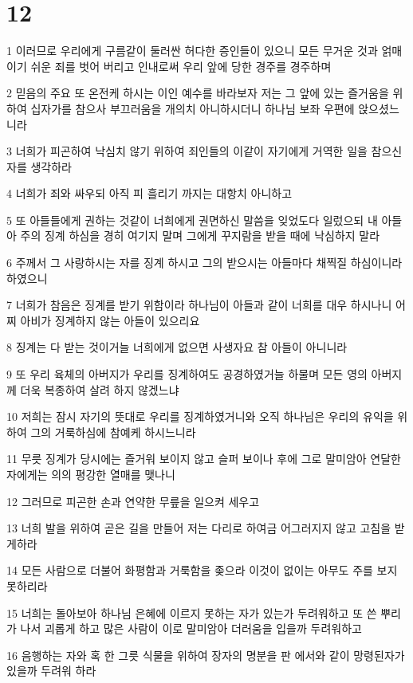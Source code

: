 \chapter{12}

\par 1 이러므로 우리에게 구름같이 둘러싼 허다한 증인들이 있으니 모든 무거운 것과 얽매이기 쉬운 죄를 벗어 버리고 인내로써 우리 앞에 당한 경주를 경주하며
\par 2 믿음의 주요 또 온전케 하시는 이인 예수를 바라보자 저는 그 앞에 있는 즐거움을 위하여 십자가를 참으사 부끄러움을 개의치 아니하시더니 하나님 보좌 우편에 앉으셨느니라
\par 3 너희가 피곤하여 낙심치 않기 위하여 죄인들의 이같이 자기에게 거역한 일을 참으신 자를 생각하라
\par 4 너희가 죄와 싸우되 아직 피 흘리기 까지는 대항치 아니하고
\par 5 또 아들들에게 권하는 것같이 너희에게 권면하신 말씀을 잊었도다 일렀으되 내 아들아 주의 징계 하심을 경히 여기지 말며 그에게 꾸지람을 받을 때에 낙심하지 말라
\par 6 주께서 그 사랑하시는 자를 징계 하시고 그의 받으시는 아들마다 채찍질 하심이니라 하였으니
\par 7 너희가 참음은 징계를 받기 위함이라 하나님이 아들과 같이 너희를 대우 하시나니 어찌 아비가 징계하지 않는 아들이 있으리요
\par 8 징계는 다 받는 것이거늘 너희에게 없으면 사생자요 참 아들이 아니니라
\par 9 또 우리 육체의 아버지가 우리를 징계하여도 공경하였거늘 하물며 모든 영의 아버지께 더욱 복종하여 살려 하지 않겠느냐
\par 10 저희는 잠시 자기의 뜻대로 우리를 징계하였거니와 오직 하나님은 우리의 유익을 위하여 그의 거룩하심에 참예케 하시느니라
\par 11 무릇 징계가 당시에는 즐거워 보이지 않고 슬퍼 보이나 후에 그로 말미암아 연달한 자에게는 의의 평강한 열매를 맺나니
\par 12 그러므로 피곤한 손과 연약한 무릎을 일으켜 세우고
\par 13 너희 발을 위하여 곧은 길을 만들어 저는 다리로 하여금 어그러지지 않고 고침을 받게하라
\par 14 모든 사람으로 더불어 화평함과 거룩함을 좆으라 이것이 없이는 아무도 주를 보지 못하리라
\par 15 너희는 돌아보아 하나님 은혜에 이르지 못하는 자가 있는가 두려워하고 또 쓴 뿌리가 나서 괴롭게 하고 많은 사람이 이로 말미암아 더러움을 입을까 두려워하고
\par 16 음행하는 자와 혹 한 그릇 식물을 위하여 장자의 명분을 판 에서와 같이 망령된자가 있을까 두려워 하라
